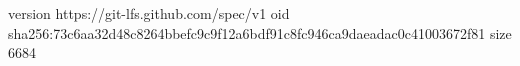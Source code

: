 version https://git-lfs.github.com/spec/v1
oid sha256:73c6aa32d48c8264bbefc9c9f12a6bdf91c8fc946ca9daeadac0c41003672f81
size 6684
